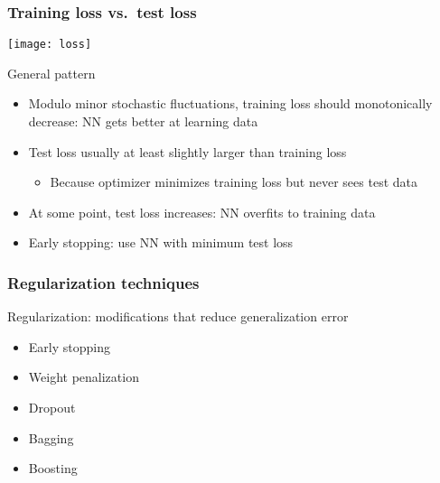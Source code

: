 \begin{frame}
    \frametitle{Training loss vs.~test loss}
    \texttt{[image: loss]}

    General pattern
    \begin{itemize}
        \item Modulo minor stochastic fluctuations, training loss should monotonically decrease: NN gets better at learning data
        \item Test loss usually at least slightly larger than training loss
        \begin{itemize}
            \item Because optimizer minimizes training loss but never sees test data
        \end{itemize}
        \item At some point, test loss increases: NN overfits to training data
        \item \alert{Early stopping}: use NN with minimum test loss
    \end{itemize}
\end{frame}

\begin{frame}
    \frametitle{Regularization techniques}

    \begin{block}{}
        Regularization: modifications that reduce generalization error
    \end{block}

    \begin{itemize}
        \item Early stopping
        \item Weight penalization
        \item Dropout
        \item Bagging
        \item Boosting
    \end{itemize}
\end{frame}


